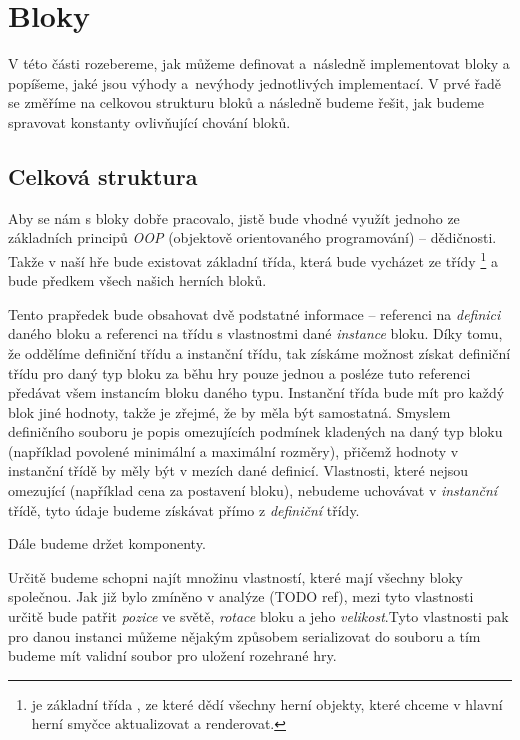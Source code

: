
\section{Bloky}

V této části rozebereme, jak můžeme definovat a~následně implementovat bloky a popíšeme, jaké jsou výhody a~nevýhody jednotlivých implementací. V prvé řadě se změříme na celkovou strukturu bloků a následně budeme řešit, jak budeme spravovat konstanty ovlivňující chování bloků.

\subsection{Celková struktura}

Aby se nám s bloky dobře pracovalo, jistě bude vhodné využít jednoho ze základních principů \textit{OOP} (objektově orientovaného programování) -- dědičnosti. Takže v naší hře bude existovat základní třída, která bude vycházet ze třídy \footnote{ je základní třída \UEu{}, ze které dědí všechny herní objekty, které chceme v hlavní herní smyčce aktualizovat a renderovat.} a bude předkem všech našich herních bloků.

Tento prapředek bude obsahovat dvě podstatné informace -- referenci na \textit{definici} daného bloku a referenci na třídu s vlastnostmi dané \textit{instance} bloku. Díky tomu, že oddělíme definiční třídu a instanční třídu, tak získáme možnost získat definiční třídu pro daný typ bloku za běhu hry pouze jednou a posléze tuto referenci předávat všem instancím bloku daného typu. Instanční třída bude mít pro každý blok jiné hodnoty, takže je zřejmé, že by měla být samostatná. Smyslem definičního souboru je popis omezujících podmínek kladených na daný typ bloku (například povolené minimální a maximální rozměry), přičemž hodnoty v instanční třídě by měly být v mezích dané definicí. Vlastnosti, které nejsou omezující (například cena za postavení bloku), nebudeme uchovávat v \textit{instanční} třídě, tyto údaje budeme získávat přímo z \textit{definiční} třídy.



Dále budeme držet komponenty.

Určitě budeme schopni najít množinu vlastností, které mají všechny bloky společnou. Jak již bylo zmíněno v analýze (TODO ref), mezi tyto vlastnosti určitě bude patřit  \textit{pozice} ve světě, \textit{rotace} bloku a jeho \textit{velikost}.Tyto vlastnosti pak pro danou instanci můžeme nějakým způsobem serializovat do souboru a tím budeme mít validní soubor pro uložení rozehrané hry. 

